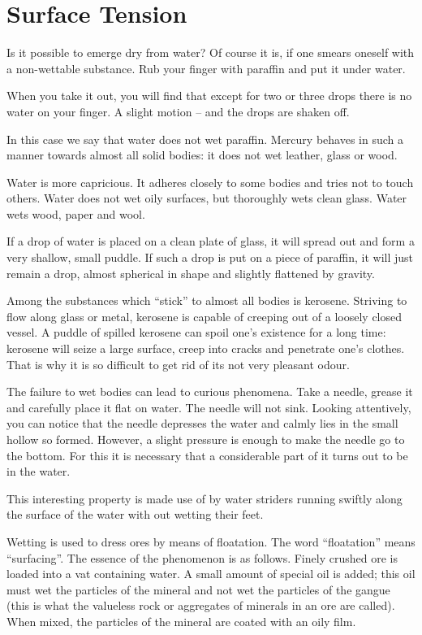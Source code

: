 \section{Surface Tension}

Is it possible to emerge dry from water? Of course it is, if one smears oneself with a non-wettable substance. Rub your finger with paraffin and put it under water.

When you take it out, you will find that except for two or three drops there is no water on your finger. A slight motion -- and the drops are shaken off.

In this case we say that water does not wet paraffin. Mercury behaves in such a manner towards almost all solid bodies: it does not wet leather, glass or wood. 

Water is more capricious. It adheres closely to some bodies and tries not to touch others. Water does not wet oily surfaces, but thoroughly wets clean glass. Water wets wood, paper and wool.

If a drop of water is placed on a clean plate of glass, it will spread out and form a very shallow, small puddle. If such a drop is put on a piece of paraffin, it will just remain a drop, almost spherical in shape and slightly flattened by gravity.

Among the substances which ``stick'' to almost all bodies is kerosene. Striving to flow along glass or metal, kerosene is capable of creeping out of a loosely closed vessel. A puddle of spilled kerosene can spoil one’s existence for a long time: kerosene will seize a large sur­face, creep into cracks and penetrate one’s clothes. That is why it is so difficult to get rid of its not very pleasant odour.

The failure to wet bodies can lead to curious phenomena. Take a needle, grease it and carefully place it flat on water. The needle will not sink. Looking attentively, you can notice that the needle depresses the water and calmly lies in the small hollow so formed. However, a slight pressure is enough to make the needle go to the bottom. For this it is necessary that a considerable part of it turns out to be in the water.



 This interesting property is made use of by water strid­ers running swiftly along the surface of the water with­ out wetting their feet.
 
Wetting is used to dress ores by means of floatation. The word ``floatation'' means ``surfacing''. The essence of the phenomenon is as follows. Finely crushed ore is loaded into a vat containing water. A small amount of special oil is added; this oil must wet the particles of the mineral and not wet the particles of the gangue (this is what the valueless rock or aggregates of minerals in an ore are called). When mixed, the particles of the mineral are coated with an oily film.

